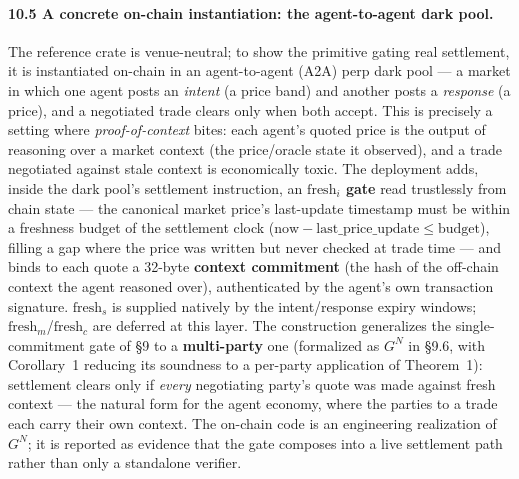 \documentclass[11pt]{article}
\begin{document}
\paragraph{10.5 A concrete on-chain instantiation: the agent-to-agent dark pool.} The reference crate is venue-neutral; to show the primitive gating real settlement, it is instantiated on-chain in an agent-to-agent (A2A) perp dark pool --- a market in which one agent posts an \emph{intent} (a price band) and another posts a \emph{response} (a price), and a negotiated trade clears only when both accept. This is precisely a setting where \emph{proof-of-context} bites: each agent's quoted price is the output of reasoning over a market context (the price/oracle state it observed), and a trade negotiated against stale context is economically toxic. The deployment adds, inside the dark pool's settlement instruction, an \textbf{$\mathrm{fresh}_i$ gate} read trustlessly from chain state --- the canonical market price's last-update timestamp must be within a freshness budget of the settlement clock ($\mathrm{now} - \mathrm{last\_price\_update} \le \mathrm{budget}$), filling a gap where the price was written but never checked at trade time --- and binds to each quote a 32-byte \textbf{context commitment} (the hash of the off-chain context the agent reasoned over), authenticated by the agent's own transaction signature. $\mathrm{fresh}_s$ is supplied natively by the intent/response expiry windows; $\mathrm{fresh}_m$/$\mathrm{fresh}_c$ are deferred at this layer. The construction generalizes the single-commitment gate of \S9 to a \textbf{multi-party} one (formalized as $G^N$ in \S9.6, with Corollary~1 reducing its soundness to a per-party application of Theorem~1): settlement clears only if \emph{every} negotiating party's quote was made against fresh context --- the natural form for the agent economy, where the parties to a trade each carry their own context. The on-chain code is an engineering realization of $G^N$; it is reported as evidence that the gate composes into a live settlement path rather than only a standalone verifier.
\end{document}
